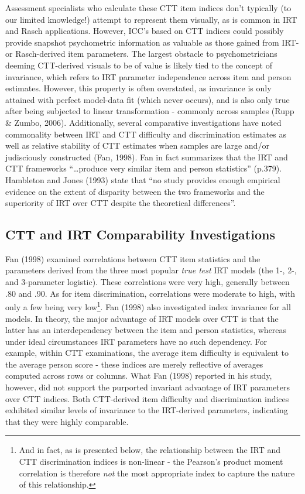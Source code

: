 \documentclass[
  man]{apa6}
\begin{document}
Assessment specialists who calculate these CTT item indices don't typically (to our limited knowledge!) attempt to represent them visually, as is common in IRT and Rasch applications. However, ICC's based on CTT indices could possibly provide snapshot psychometric information as valuable as those gained from IRT- or Rasch-derived item parameters. The largest obstacle to psychometricians deeming CTT-derived visuals to be of value is likely tied to the concept of invariance, which refers to IRT parameter independence across item and person estimates. However, this property is often overstated, as invariance is only attained with perfect model-data fit (which never occurs), and is also only true after being subjected to linear transformation - commonly across samples (Rupp \& Zumbo, 2006). Additionally, several comparative investigations have noted commonality between IRT and CTT difficulty and discrimination estimates as well as relative stability of CTT estimates when samples are large and/or judisciously constructed (Fan, 1998). Fan in fact summarizes that the IRT and CTT frameworks ``\ldots produce very similar item and person statistics'' (p.379). Hambleton and Jones (1993) state that ``no study provides enough empirical evidence on the extent of disparity between the two frameworks and the superiority of IRT over CTT despite the theoretical differences''.

\hypertarget{ctt-and-irt-comparability-investigations}{%
\subsection{CTT and IRT Comparability Investigations}\label{ctt-and-irt-comparability-investigations}}

Fan (1998) examined correlations between CTT item statistics and the parameters derived from the three most popular \emph{true test} IRT models (the 1-, 2-, and 3-parameter logistic). These correlations were very high, generally between .80 and .90. As for item discrimination, correlations were moderate to high, with only a few being very low\footnote{And in fact, as is presented below, the relationship between the IRT and CTT discrimination indices is non-linear - the Pearson's product moment correlation is therefore \emph{not} the most appropriate index to capture the nature of this relationship.}. Fan (1998) also investigated index invariance for all models. In theory, the major advantage of IRT models over CTT is that the latter has an interdependency between the item and person statistics, whereas under ideal circumstances IRT parameters have no such dependency. For example, within CTT examinations, the average item difficulty is equivalent to the average person score - these indices are merely reflective of averages computed across rows or columns. What Fan (1998) reported in his study, however, did not support the purported invariant advantage of IRT parameters over CTT indices. Both CTT-derived item difficulty and discrimination indices exhibited similar levels of invariance to the IRT-derived parameters, indicating that they were highly comparable.
\end{document}
